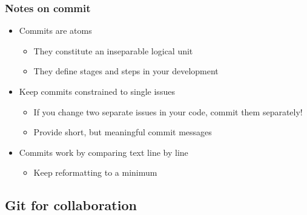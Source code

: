 \begin{frame}
  \frametitle{Notes on commit}
  \begin{itemize}
  \item Commits are atoms
    \begin{itemize}
    \item They constitute an inseparable logical unit
    \item They define stages and steps in your development
    \end{itemize}
  \item Keep commits constrained to single issues
    \begin{itemize}
    \item If you change two separate issues in your code, commit them
      separately!
    \item Provide short, but meaningful commit messages
    \end{itemize}
  \item Commits work by comparing text line by line
    \begin{itemize}
    \item Keep reformatting to a minimum
    \end{itemize}
  \end{itemize}
\end{frame}

\subsection{Git for collaboration}
\frame{\tableofcontents[currentsection,subsectionstyle=show/shaded/hide]}

